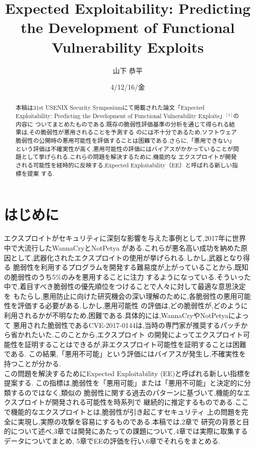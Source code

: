 \documentclass[submit,techreq,noauthor]{eco}	%
\begin{document}
\date   {4/12/16/金}				%
\title  {Expected Exploitability: Predicting the Development of Functional Vulnerability Exploits}	%
\author {山下 恭平}				%

\begin{abstract}
本稿は31st USENIX Security Symposiumにて掲載された論文「Expected Exploitability: Predicting 
the Development of Functional Vulnerability Exploits」\begin{math}^{[1]}\end{math}の内容に
ついてまとめたものである.既存の脆弱性評価基準の分析を通じて得られる結果は,その脆弱性が悪用されることを予測する
のには不十分であるため,ソフトウェア脆弱性の公開時の悪用可能性を評価することは困難である.さらに,「悪用できない」
という評価は不確実性が高く,悪用可能性の評価にはバイアスがかかっていることが問題として挙げられる.これらの問題を解決するために,機能的な
エクスプロイトが開発される可能性を経時的に反映する,Expected Exploitability（EE）と呼ばれる新しい指標を提案
する.

\end{abstract}
\maketitle

\section{はじめに}
エクスプロイトがセキュリティに深刻な影響を与えた事例として,2017年に世界中で大流行したWannaCryとNotPetya
がある.これらが悪名高い成功を納めた原因として,武器化されたエクスプロイトの使用が挙げられる.しかし,武器となり得る
脆弱性を利用するプログラムを開発する難易度が上がっていることから,既知の脆弱性のうち5\%のみを悪用することに注力
するようになっている.そういった中で,着目すべき脆弱性の優先順位をつけることで人々に対して最適な意思決定を
もたらし,悪用防止に向けた研究機会の深い理解のために,各脆弱性の悪用可能性を評価する必要がある.しかし,悪用可能性
の評価は,どの脆弱性が,どのように利用されるかが不明なため,困難である.具体的には,WannaCryやNotPetyaによって
悪用された脆弱性であるCVE-2017-0144は,当時の専門家が推奨するパッチから省かれたいた.このことから,エクスプロイト
の開発によってエクスプロイト可能性を証明することはできるが,非エクスプロイト可能性を証明することは困難である.
この結果,「悪用不可能」という評価にはバイアスが発生し,不確実性を持つことが分かる.\\
\indent この問題を解決するためにExpected Exploitability (EE)と呼ばれる新しい指標を提案する.
この指標は,脆弱性を「悪用可能」または「悪用不可能」と決定的に分類するのではなく,類似の
脆弱性に関する過去のパターンに基づいて,機能的なエクスプロイトが開発される可能性を時系列で
継続的に推定するものである.ここで機能的なエクスプロイトとは,脆弱性が引き起こすセキュリティ
上の問題を完全に実現し,実際の攻撃を容易にするものである.本稿では,2章で
研究の背景と目的について述べ,3章では開発にあたっての課題について,4章では実際に取集するデータについてまとめ,
5章でEEの評価を行い,6章でそれらをまとめる.
\end{document}

